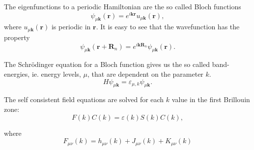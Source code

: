 \documentclass[12pt,a4paper,english]{beamer}
\newcommand{\mbf}{ \mathbf }
\begin{document}
\begin{frame}
  The eigenfunctions to a periodic Hamiltonian are the so called Bloch functions
  $$\psi_{\mu\mbf k}(\mbf r)=e^{i\mbf k\mbf r}u_{\mu\mbf k}(\mbf r),$$ where $u_{\mu\mbf k}(\mbf r)$ is periodic in $\mbf r.$ It is easy to see that the wavefunction has the property
  $$\psi_{\mu\mbf k}(\mbf r+\mbf R_n)=e^{i\mbf k\mbf R_n}\psi_{\mu\mbf k}(\mbf r).$$

  The Schr\"odinger equation for a Bloch function gives us the so called 
  band-energies, ie. energy levels, $\mu$, that are dependent on the 
  parameter $k.$
  $$H\psi_{\mu\mbf k}=\varepsilon_{\mu,k}\psi_{\mu\mbf k}.$$
\end{frame}

\begin{frame}

	   The self consistent field equations are solved 
	   for each $k$ value in the first Brillouin zone:
		\begin{equation*}
				F(k)C(k)=\varepsilon(k)S(k)C(k),
		\end{equation*}

		where
		\begin{equation}
		  F_{\mu\nu}(k)=h_{\mu\nu}(k)+J_{\mu\nu}(k) + K_{\mu\nu}(k)
		  \label{eq:kspacefock}
		\end{equation}


\end{frame}

%
\end{document}
